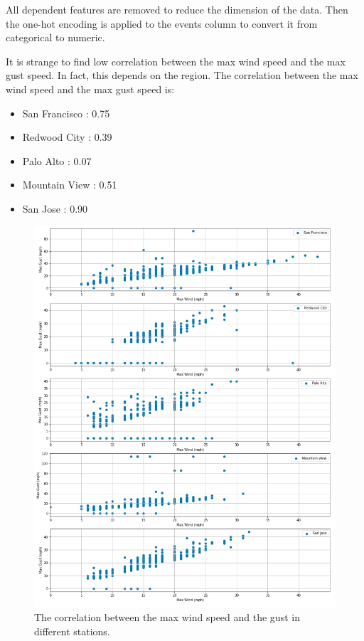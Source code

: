 \documentclass[a4paper]{article}
\begin{document}
			All dependent features are removed to reduce the dimension of the data. Then the one-hot encoding is applied to the events column to convert it from categorical to numeric.
			
			It is strange to find low correlation between the max wind speed and the max gust speed. In fact, this depends on the region. The correlation between the max wind speed and the max gust speed is: 
			
			\begin{itemize} 
				\item San Francisco : 0.75
				\item Redwood City : 0.39
				\item Palo Alto : 0.07
				\item Mountain View : 0.51
				\item San Jose : 0.90
			\end{itemize}
			
			\begin{figure}
				\centering
				\includegraphics[width=1\textwidth]{WindGust.png}
				\caption{\label{fig:wind_gust}The correlation between the max wind speed and the gust in different stations.}
			\end{figure}			
			
\end{document}
